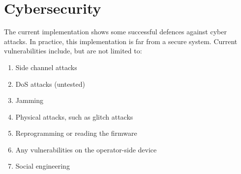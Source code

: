 \section{Cybersecurity}
The current implementation shows some successful defences against cyber attacks. In practice, this implementation is far from a secure system. Current vulnerabilities include, but are not limited to:
\begin{enumerate}[nosep]
    \item Side channel attacks
    \item DoS attacks (untested)
    \item Jamming
    \item Physical attacks, such as glitch attacks
    \item Reprogramming or reading the firmware
    \item Any vulnerabilities on the operator-side device
    \item Social engineering
\end{enumerate}
